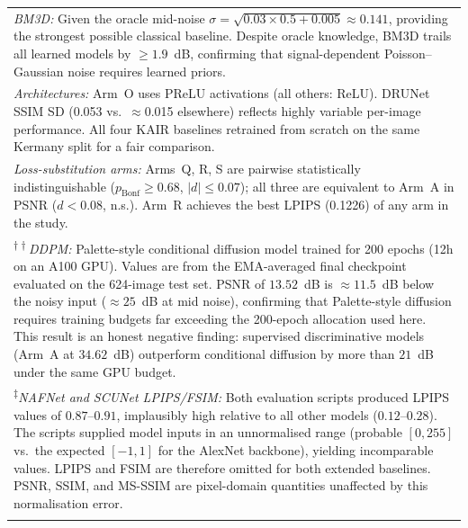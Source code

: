 \documentclass[12pt, a4paper, twoside, openright]{book}
\begin{document}
\begin{landscape}
\begin{longtable}{llcccccc}
\multicolumn{8}{p{0.97\linewidth}}{\footnotesize
  \textit{BM3D:} Given the oracle mid-noise $\sigma=\sqrt{0.03\times0.5+0.005}\approx0.141$, providing the strongest possible classical baseline. Despite oracle knowledge, BM3D trails all learned models by $\geq 1.9$~dB, confirming that signal-dependent Poisson--Gaussian noise requires learned priors.} \\[3pt]
\multicolumn{8}{p{0.97\linewidth}}{\footnotesize
  \textit{Architectures:} Arm~O uses PReLU activations (all others: ReLU). DRUNet SSIM SD (0.053 vs.\ $\approx$0.015 elsewhere) reflects highly variable per-image performance. All four KAIR baselines retrained from scratch on the same Kermany split for a fair comparison.} \\[3pt]
\multicolumn{8}{p{0.97\linewidth}}{\footnotesize
  \textit{Loss-substitution arms:} Arms~Q, R, S are pairwise statistically indistinguishable ($p_{\mathrm{Bonf}} \geq 0.68$, $|d| \leq 0.07$); all three are equivalent to Arm~A in PSNR ($d < 0.08$, n.s.). Arm~R achieves the best LPIPS (0.1226) of any arm in the study.} \\[3pt]
\multicolumn{8}{p{0.97\linewidth}}{\footnotesize
  \textsuperscript{$\dagger\dagger$}\textit{DDPM:} Palette-style conditional diffusion model \cite{saharia_palette_2022} trained for 200 epochs (12h on an A100 GPU). Values are from the EMA-averaged final checkpoint evaluated on the 624-image test set. PSNR of $13.52$~dB is $\approx11.5$~dB below the noisy input ($\approx25$~dB at mid noise), confirming that Palette-style diffusion requires training budgets far exceeding the 200-epoch allocation used here. This result is an honest negative finding: supervised discriminative models (Arm~A at $34.62$~dB) outperform conditional diffusion by more than $21$~dB under the same GPU budget.} \\[3pt]
\multicolumn{8}{p{0.97\linewidth}}{\footnotesize
  \textsuperscript{$\ddagger$}\textit{NAFNet and SCUNet LPIPS/FSIM:} Both evaluation scripts produced LPIPS values of $0.87$--$0.91$, implausibly high relative to all other models ($0.12$--$0.28$). The scripts supplied model inputs in an unnormalised range (probable $[0,255]$ vs.\ the expected $[-1,1]$ for the AlexNet backbone), yielding incomparable values. LPIPS and FSIM are therefore omitted for both extended baselines. PSNR, SSIM, and MS-SSIM are pixel-domain quantities unaffected by this normalisation error.} \\
\endlastfoot
%
\multicolumn{8}{l}{\textit{L2 / L1 deterministic arms}} \\

\end{longtable}
\end{landscape}
\end{document}
